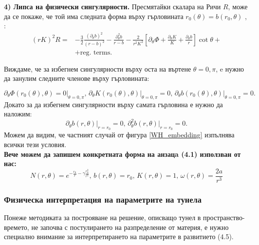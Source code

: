 \noindent\textbf{4) Липса на физически сингулярности.} Пресмятайки скалара на Ричи $R$, може да се покаже, че той има следната форма върху гърловината $r_0(\theta) = b(r_0,\theta)$ \cite{Teo}, \cite{Harko_2009}:
\begin{equation}
	\begin{aligned}
		(rK)^2R = &-\frac{3}{2}\frac{(\partial_\theta b)^2}{(r - b)^2} - \frac{\partial^2_\theta b}{r - b}
	- \frac{2}{r^2K^2}\left[\partial_\theta \Phi + \frac{\partial_\theta K}{K} + \frac{\partial_\theta b}{r}\right]\cot\theta + \\ 
	& + \text{reg. terms}.
	\end{aligned}
\end{equation}

\noindent Виждаме, че за избегнем сингулярности върху оста на въртене $\theta = 0,\pi$, e нужно да занулим следните членове върху гърловината:

\begin{equation}
	\partial_\theta \Phi(r_0(\theta),\theta) = 0\big\vert_{\theta = 0,\pi},\, \partial_\theta K(r_0(\theta),\theta)\big\vert_{\theta = 0,\pi} = 0,\,\partial_\theta b(r_0(\theta),\theta)\big\vert_{\theta = 0,\pi} = 0.
\end{equation}
Докато за да избегнем сингулярности върху самата гърловина е нужно да наложим:
\begin{equation}
	\partial_\theta b(r,\theta)\big\vert_{r = r_0} = 0,\, \partial^2_\theta b(r,\theta)\big\vert_{r = r_0} = 0.
\end{equation}
Можем да видим, че частният случай от фигура \ref{WH_embedding} изпълнява всички тези условия.\\

\noindent\textbf{Вече можем да запишем конкретната форма на анзацa (4.1) използван от нас:}
\begin{equation}
	N(r,\theta) = e^{-\frac{r_0}{r} - \gamma\frac{r_0^2}{r^2}},\, b(r,\theta) = r_0,\, K(r,\theta) = 1,\, \omega(r,\theta) = \frac{2a}{r^3}
\end{equation}

\subsubsection{Физическа интерпретация на параметрите на тунела}

Понеже методиката за построяване на решение, описващо тунел в пространство-времето, не започва с постулирането на разпределение от материя, е нужно специално внимание за интерпретирането на параметрите в развитието (4.5).\\

